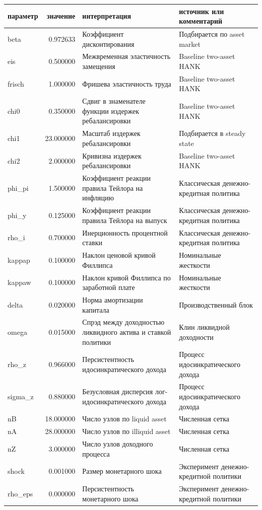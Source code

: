 \begin{tabular}{lrll}
\toprule
параметр & значение & интерпретация & источник или комментарий \\
\midrule
beta & 0.972633 & Коэффициент дисконтирования & Подбирается по asset market \\
eis & 0.500000 & Межвременная эластичность замещения & Baseline two-asset HANK \\
frisch & 1.000000 & Фришева эластичность труда & Baseline two-asset HANK \\
chi0 & 0.350000 & Сдвиг в знаменателе функции издержек ребалансировки & Baseline two-asset HANK \\
chi1 & 23.000000 & Масштаб издержек ребалансировки & Подбирается в steady state \\
chi2 & 2.000000 & Кривизна издержек ребалансировки & Baseline two-asset HANK \\
phi_pi & 1.500000 & Коэффициент реакции правила Тейлора на инфляцию & Классическая денежно-кредитная политика \\
phi_y & 0.125000 & Коэффициент реакции правила Тейлора на выпуск & Классическая денежно-кредитная политика \\
rho_i & 0.700000 & Инерционность процентной ставки & Классическая денежно-кредитная политика \\
kappap & 0.100000 & Наклон ценовой кривой Филлипса & Номинальные жесткости \\
kappaw & 0.100000 & Наклон кривой Филлипса по заработной плате & Номинальные жесткости \\
delta & 0.020000 & Норма амортизации капитала & Производственный блок \\
omega & 0.015000 & Спрэд между доходностью ликвидного актива и ставкой политики & Клин ликвидной доходности \\
rho_z & 0.966000 & Персистентность идосинкратического дохода & Процесс идосинкратического дохода \\
sigma_z & 0.880000 & Безусловная дисперсия лог-идосинкратического дохода & Процесс идосинкратического дохода \\
nB & 18.000000 & Число узлов по liquid asset & Численная сетка \\
nA & 28.000000 & Число узлов по illiquid asset & Численная сетка \\
nZ & 3.000000 & Число узлов доходного процесса & Численная сетка \\
shock & 0.001000 & Размер монетарного шока & Эксперимент денежно-кредитной политики \\
rho_eps & 0.000000 & Персистентность монетарного шока & Эксперимент денежно-кредитной политики \\
\bottomrule
\end{tabular}
